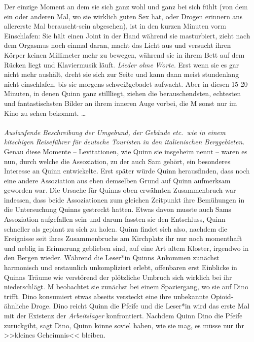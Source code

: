 Der einzige Moment an dem sie sich ganz wohl und ganz bei sich fühlt (von dem
ein oder anderen Mal, wo sie wirklich guten Sex hat, oder Drogen erinnern ans
allererste Mal berauscht-sein abgesehen), ist in den kurzen Minuten vorm
Einschlafen:  
Sie hält einen Joint in der Hand während sie masturbiert, zieht nach dem Orgasmus
noch einmal daran, macht das Licht aus und versucht ihren Körper keinen
Millimeter mehr zu bewegen, während sie in ihrem Bett auf dem Rücken liegt und
Klaviermusik läuft. \emph{Lieder ohne Worte.} 
Erst wenn sie es gar nicht mehr aushält, dreht sie sich zur Seite und kann dann
meist stundenlang nicht einschlafen, bis sie morgens schweißgebadet aufwacht. 
Aber in diesen 15-20 Minuten, in denen Quinn ganz stillliegt, ziehen die
berauschendsten, echtesten und fantastischsten Bilder an ihrem inneren Auge
vorbei, die M sonst nur im Kino zu sehen bekommt. \dots\\\\
%
\emph{Auslaufende Beschreibung der Umgebund, der Gebäude etc.~wie in einem
  kitschigen Reiseführer für deutsche Touristen in den italienischen
Berggebieten.} 
Genau diese Momente -- Levitationen, wie Quinn sie insgeheim nennt -- waren
es nun, durch welche die Assoziation, zu der auch Sam gehört,
ein besonderes Interesse an Quinn entwickelte. 
Erst später würde Quinn herausfinden, dass noch eine andere Assoziation aus eben
demselben Grund auf Quinn aufmerksam geworden war. 
Die Ursache für Quinns oben erwähnten Zusammenbruch war indessen, dass beide
Assoziationen zum gleichen Zeitpunkt ihre Bemühungen in die Untersuchung Quinns
gestreckt hatten. 
Etwas davon musste auch Sams Assoziation aufgefallen sein und darum fassten sie
den Entschluss, Quinn schneller als geplant zu sich zu holen. 
Quinn findet sich also, nachdem die Ereignisse seit ihres Zusammenbruchs am
Kirchplatz ihr nur noch momenthaft und neblig in Erinnerung geblieben sind, auf
eine Art altem Kloster, irgendwo in den Bergen wieder. 
Während die Leser*in Quinns Ankommen zunächst harmonisch und erstaunlich
unkompliziert erlebt, offenbaren erst Einblicke in Quinns Träume wie verstörend
der plötzliche Umbruch sich wirklich bei ihr niederschlägt. 
M beobachtet sie zunächst bei einem Spaziergang, wo sie auf Dino trifft. 
Dino konsumiert etwas abseits versteckt eine ihre unbekannte Opioid-ähnliche
Droge. 
Dino reicht Quinn die Pfeife und die Leser*in wird das erste Mal mit der Existenz
der \emph{Arbeitslager} konfrontiert.
Nachdem Quinn Dino die Pfeife zurückgibt, sagt Dino, Quinn könne soviel haben,
wie sie mag, es müsse nur ihr >>kleines Geheimnis<< bleiben. 
